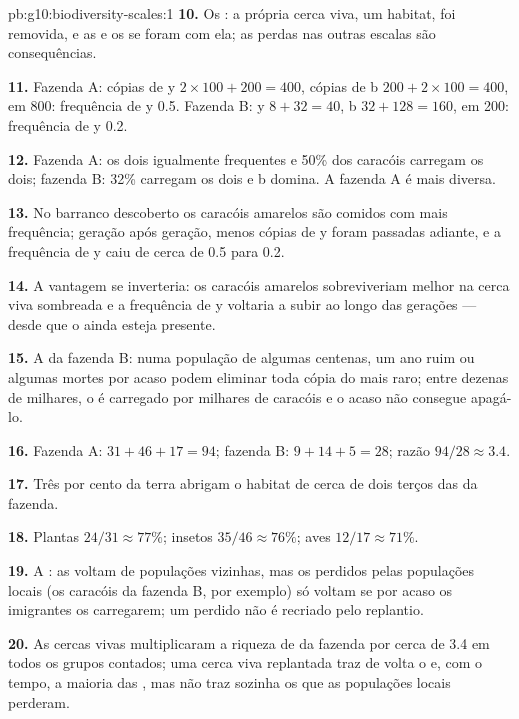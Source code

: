 \begin{solution}{pb:g10:biodiversity-scales:1}
\textbf{10.} Os : a própria cerca viva, um habitat, foi
removida, e as  e os  se foram com ela; as perdas nas
outras escalas são consequências.

\textbf{11.} Fazenda A: cópias de y $2 \times 100 + 200 = 400$, cópias
de b $200 + 2 \times 100 = 400$, em 800: frequência de y 0.5. Fazenda
B: y $8 + 32 = 40$, b $32 + 128 = 160$, em 200: frequência de y 0.2.

\textbf{12.} Fazenda A: os dois  igualmente frequentes e 50\% dos
caracóis carregam os dois; fazenda B: 32\% carregam os dois e b domina.
A fazenda A é mais diversa.

\textbf{13.} No barranco descoberto os caracóis amarelos são comidos com
mais frequência; geração após geração, menos cópias de y foram
passadas adiante, e a frequência de y caiu de cerca de 0.5 para 0.2.

\textbf{14.} A vantagem se inverteria: os caracóis amarelos
sobreviveriam melhor na cerca viva sombreada e a frequência de y
voltaria a subir ao longo das gerações --- desde que o  ainda
esteja presente.

\textbf{15.} A da fazenda B: numa população de algumas centenas, um ano
ruim ou algumas mortes por acaso podem eliminar toda cópia do 
mais raro; entre dezenas de milhares, o  é carregado por milhares
de caracóis e o acaso não consegue apagá-lo.

\textbf{16.} Fazenda A: $31 + 46 + 17 = 94$; fazenda B:
$9 + 14 + 5 = 28$; razão $94/28 \approx 3.4$.

\textbf{17.} Três por cento da terra abrigam o habitat de cerca de dois
terços das  da fazenda.

\textbf{18.} Plantas $24/31 \approx 77\%$; insetos $35/46 \approx 76\%$;
aves $12/17 \approx 71\%$.

\textbf{19.} A : as  voltam de populações
vizinhas, mas os  perdidos pelas populações locais (os caracóis da
fazenda B, por exemplo) só voltam se por acaso os imigrantes os
carregarem; um  perdido não é recriado pelo replantio.

\textbf{20.} As cercas vivas multiplicaram a riqueza de  da
fazenda por cerca de 3.4 em todos os grupos contados; uma cerca viva
replantada traz de volta o  e, com o tempo, a maioria das
, mas não traz sozinha os  que as populações locais
perderam.
\end{solution}
